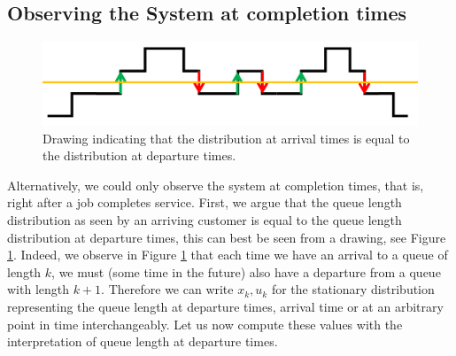 \documentclass[12pt]{report}
\begin{document}
\begin{appendices}
\section{Observing the System at completion times} \label{sec:MM1_completion}
\begin{figure}
\begin{center}
\includegraphics[scale=0.5]{figures/Appendix/MM1_arrival_departure.PNG}
\end{center}
\caption{Drawing indicating that the distribution at arrival times is equal to the distribution at departure times.} \label{fig:arrival_departure}
\end{figure}
Alternatively, we could only observe the system at completion times, that is, right after a job completes service. First, we argue that the queue length distribution as seen by an arriving customer is equal to the queue length distribution at departure times, this can best be seen from a drawing, see Figure \ref{fig:arrival_departure}. Indeed, we observe in Figure \ref{fig:arrival_departure} that each time we have an arrival to a queue of length $k$, we must (some time in the future) also have a departure from a queue with length $k+1$. Therefore we can write $x_k, u_k$ for the stationary distribution representing the queue length at departure times, arrival time or at an arbitrary point in time interchangeably. Let us now compute these values with the interpretation of queue length at departure times.


\end{appendices}
\end{document}
